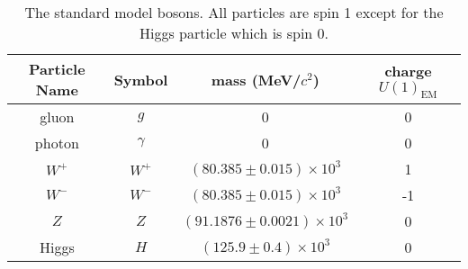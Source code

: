\begin{table}
  \centering
  \begin{tabular}{c c c c}
    Particle Name & Symbol    & mass (MeV/$c^2$)                & charge $U(1)_{\mbox{EM}}$ \\
    \hline
    gluon         & $g$       & 0                               &  0                        \\
    photon        & $\gamma$  & 0                               &  0                        \\
    $W^+$         & $W^+$     & $(80.385\pm0.015)\times10^3$    &  1                        \\
    $W^-$         & $W^-$     & $(80.385\pm0.015)\times10^3$    & -1                        \\
    $Z$           & $Z$       & $(91.1876\pm0.0021)\times10^3$  &  0                        \\
    Higgs         & $H$       & $(125.9\pm0.4)\times10^3$       &  0
  \end{tabular}
  \label{table:bosons}
  \caption{The standard model bosons.  All particles are spin 1 except for the Higgs particle which is spin 0.}
\end{table}
